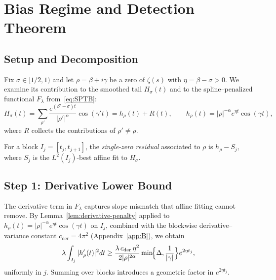 
\section{Bias Regime and Detection Theorem}\label{sec:bias}

\subsection{Setup and Decomposition}

Fix $\sigma\in[1/2,1)$ and let $\rho=\beta+i\gamma$ be a zero of $\zeta(s)$ with
$\eta=\beta-\sigma>0$.  We examine its contribution to the smoothed tail
$H_\sigma(t)$ and to the spline–penalized functional $F_\lambda$
from~\eqref{eq:SPTB}:
\begin{equation*}
H_\sigma(t)
  = \sum_{\rho'} \frac{e^{(\beta'-\sigma)t}}{|\rho'|^{\alpha}}\cos(\gamma' t)
  = h_\rho(t)+R(t),
\qquad
h_\rho(t)=|\rho|^{-\alpha}e^{\eta t}\cos(\gamma t),
\end{equation*}
where $R$ collects the contributions of $\rho'\ne\rho$.

\begin{definition}\label{def:single-zero}
For a block $I_j=[t_j,t_{j+1}]$, the \emph{single-zero residual}
associated to $\rho$ is $h_\rho-S_j$, where $S_j$ is the $L^2(I_j)$-best affine fit to $H_\sigma$.
\end{definition}

\subsection{Step 1: Derivative Lower Bound}\label{step:derivative-lb}

The derivative term in $F_\lambda$ captures slope mismatch that affine fitting cannot remove.
By Lemma~\ref{lem:derivative-penalty} applied to $h_\rho(t)=|\rho|^{-\alpha}e^{\eta t}\cos(\gamma t)$
on $I_j$, combined with the blockwise derivative--variance constant $c_{\mathrm{der}}=4\pi^2$
(Appendix~\ref{app:B}), we obtain
\begin{equation}
\lambda \int_{I_j} |h_\rho'(t)|^2 dt
  \ge \frac{\lambda\,c_{\mathrm{der}}\,\eta^2}{2|\rho|^{2\alpha}}
      \min\!\Bigl\{\Delta,\frac{1}{|\gamma|}\Bigr\}
      e^{2\eta t_j},
\label{eq:derivative-lb}
\end{equation}
uniformly in $j$.  Summing over blocks introduces a geometric factor in $e^{2\eta t_j}$.

